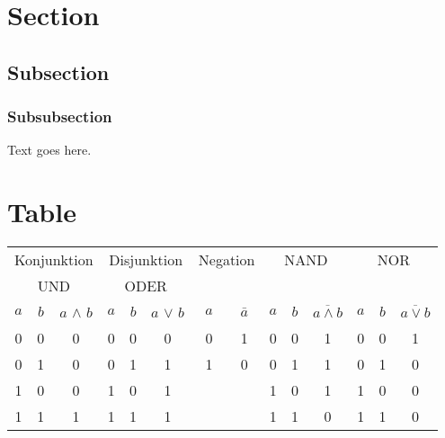 \section{Section}





\subsection{Subsection}






\subsubsection{Subsubsection}

Text goes here.






\section{Table}
\begin{center}
	\begin{tabular}[c]{c | c | c || c| c | c || c | c || c | c | c || c| c| c}
		\multicolumn{3}{c||}{Konjunktion}	&	\multicolumn{3}{c||}{Disjunktion} & \multicolumn{2}{c||}{Negation} & \multicolumn{3}{c||}{NAND} & \multicolumn{3}{c}{NOR}\\
		\multicolumn{3}{c||}{UND}	&	\multicolumn{3}{c||}{ODER} & \multicolumn{2}{c||}{} & \multicolumn{3}{c||}{} & \multicolumn{3}{c}{}\\
		\hline
		$a$ & $b$ & $a$ $\wedge$ $b$ & $a$ & $b$ & $a$ $\vee$ $b$ & $a$ & $\bar{a}$ & $a$ & $b$ & $\overline{a \wedge b}$ & $a$ & $b$ & $\overline{a \vee b}$\\
		\hline
		0 & 0 & 0 & 0 & 0 & 0 & 0 & 1 & 0 & 0 & 1 & 0 & 0 & 1\\
		0 & 1 & 0 & 0 & 1 & 1 & 1 & 0 & 0 & 1 & 1 & 0 & 1 & 0\\
		1 & 0 & 0 & 1 & 0 & 1 & & & 1 & 0 & 1 & 1 & 0 & 0\\
		1 & 1 & 1 & 1 & 1 & 1 & & & 1 & 1 & 0 & 1 & 1 & 0\\
		\hline
	\end{tabular}
\end{center}











